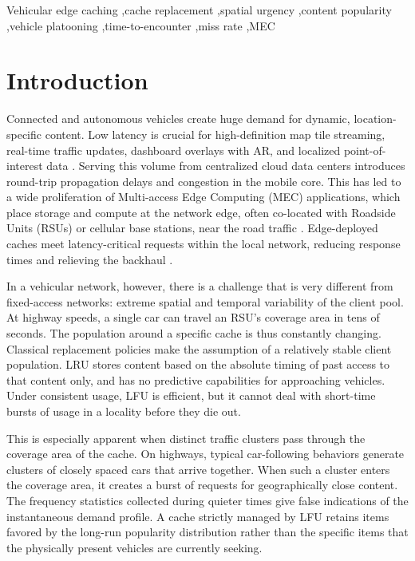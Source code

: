 \documentclass[preprint,12pt]{elsarticle}
\begin{document}
\begin{frontmatter}
		\begin{keyword}
			Vehicular edge caching \sep cache replacement \sep spatial urgency \sep content popularity \sep vehicle platooning \sep time-to-encounter \sep miss rate \sep MEC
		\end{keyword}
		
	\end{frontmatter}
	
	\section{Introduction}

	\label{sec:intro}
	
	Connected and autonomous vehicles create huge demand for dynamic, location-specific content. Low latency is crucial for high-definition map tile streaming, real-time traffic updates, dashboard overlays with AR, and localized point-of-interest data \cite{zhang2020mobile}. Serving this volume from centralized cloud data centers introduces round-trip propagation delays and congestion in the mobile core. This has led to a wide proliferation of Multi-access Edge Computing (MEC) applications, which place storage and compute at the network edge, often co-located with Roadside Units (RSUs) or cellular base stations, near the road traffic \cite{taleb2017multi, Cao_2020, Yousefpour_2019, Khan_2019}. Edge-deployed caches meet latency-critical requests within the local network, reducing response times and relieving the backhaul \cite{pham2020survey, bastug2014living}.
	
	In a vehicular network, however, there is a challenge that is very different from fixed-access networks: extreme spatial and temporal variability of the client pool. At highway speeds, a single car can travel an RSU's coverage area in tens of seconds. The population around a specific cache is thus constantly changing. Classical replacement policies make the assumption of a relatively stable client population. LRU stores content based on the absolute timing of past access to that content only, and has no predictive capabilities for approaching vehicles. Under consistent usage, LFU is efficient, but it cannot deal with short-time bursts of usage in a locality before they die out. 
	
	This is especially apparent when distinct traffic clusters pass through the coverage area of the cache. On highways, typical car-following behaviors generate clusters of closely spaced cars that arrive together. When such a cluster enters the coverage area, it creates a burst of requests for geographically close content. The frequency statistics collected during quieter times give false indications of the instantaneous demand profile. A cache strictly managed by LFU retains items favored by the long-run popularity distribution rather than the specific items that the physically present vehicles are currently seeking. 
	
\end{document}
